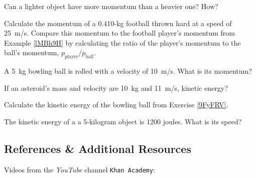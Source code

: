 \documentclass[main.tex]{subfiles}
\begin{document}

\begin{exercise}
    Can a lighter object have more momentum than a heavier one? How?
\end{exercise}


\begin{exercise} \label{QDJrfn}
    Calculate the momentum of a 0.410-kg football thrown hard at a speed of \SI{25}{m/s}. Compare this momentum to the football player's momentum from Example \ref{lMBh9H} by calculating the ratio of the player's momentum to the ball's momentum, $p_{\text{player}}/p_{\text{ball}}$.
\end{exercise}

\begin{exercise} \label{9FyFRV}
    A \SI{5}{kg} bowling ball is rolled with a velocity of \SI{10}{m/s}. What is its momentum?
\end{exercise}


\begin{exercise} \label{5CHfrd}
    If an asteroid's mass and velocity are \SI{10}{kg} and \SI{11}{m/s}, kinetic energy?
\end{exercise}

\begin{exercise} \label{s9xduj}
    Calculate the kinetic energy of the bowling ball from Exercise \ref{9FyFRV}.
\end{exercise}

\begin{exercise} \label{pVdq3i}
    The kinetic energy of a a 5-kilogram object is 1200 joules. What is its speed?
\end{exercise}


\clearpage
\printnoidxglossaries

\clearpage

\subsection{References \& Additional Resources}

Videos from the \textit{YouTube} channel \texttt{Khan Academy}:
\vspace{-1ex}
\end{document}
